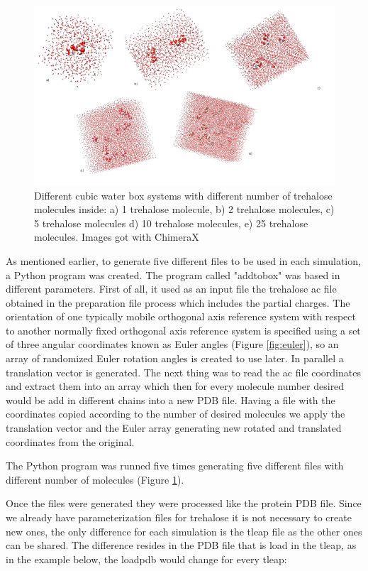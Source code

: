 \documentclass[a4paper]{article}
\begin{document}
\begin{figure}[h]
    \centering
    \includegraphics[width = 1\hsize]{./figures/trewat}
    \caption{Different cubic water box systems with different number of trehalose molecules inside: a) 1 trehalose molecule, b) 2 trehalose molecules, c) 5 trehalose molecules d) 10 trehalose molecules, e) 25 trehalose molecules. Images got with ChimeraX}
    \label{fig:trewat}
\end{figure}

As mentioned earlier, to generate five different files to be used in each simulation, a Python program was created. The program called "addtobox" was based in different parameters. First of all, it used as an input file the trehalose ac file obtained in the preparation file process which includes the partial charges. The orientation of one typically mobile orthogonal axis reference system with respect to another normally fixed orthogonal axis reference system is specified using a set of three angular coordinates known as Euler angles (Figure \ref{fig:euler}), so an array of randomized Euler rotation angles is created to use later. In parallel a translation vector is generated. The next thing was to read the ac file coordinates and extract them into an array which then for every molecule number desired would be add in different chains into a new PDB file. Having a file with the coordinates copied according to the number of desired molecules we apply the translation vector and the Euler array generating new rotated and translated coordinates from the original.

The Python program was runned five times generating five different files with different number of molecules (Figure \ref{fig:trewat}).

Once the files were generated they were processed like the protein PDB file. Since we already have parameterization files for trehalose it is not necessary to create new ones, the only difference for each simulation is the tleap file as the other ones can be shared. The difference resides in the PDB file that is load in the tleap, as in the example below, the loadpdb would change for every tleap:
\end{document}

